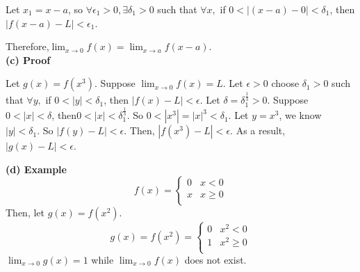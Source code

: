 \documentclass[a4paper,12pt]{report}
\begin{document}
\noindent
Let $x_1 = x-a$, so $\forall \epsilon_1>0, \exists \delta_1>0$ such that $\forall x,$ if $0<|(x-a)-0|<\delta_1$, then $|f(x-a)-L|<\epsilon_1$.

\noindent
Therefore,$\displaystyle{\lim_{x\to 0}}f(x)=\displaystyle{\lim_{x\to a}}f(x-a)$.\\

\noindent
\textbf{(c) Proof}

\noindent
Let $g(x)=f(x^3)$. Suppose $\displaystyle{\lim_{x\to 0}}f(x)=L$. Let $\epsilon >0$ choose $\delta_1>0$ such that $\forall y,$ if $0<|y|<\delta_1$, then $|f(x)-L|<\epsilon$. Let $\delta = \delta_1^\frac{1}{3}>0$. Suppose $0<|x|<\delta$, then$0<|x|<\delta_1^\frac{1}{3}$. So $0<|x^3|=|x|^3<\delta_1$. Let $y=x^3$, we know $|y|<\delta_1$. So $|f(y)-L|<\epsilon$. Then, $|f(x^3)-L|<\epsilon$. As a result, $|g(x)-L|<\epsilon$. 

\noindent
\textbf{(d) Example}
\[  f(x)= \left\{
\begin{array}{ll}
      0 & x<0 \\
      x & x\geq 0 \\
\end{array} 
\right. \]
\noindent
Then, let $g(x) = f(x^2)$.
\[  g(x)=f(x^2)= \left\{
\begin{array}{ll}
      0 & x^2<0 \\
      1 & x^2\geq 0 \\
\end{array} 
\right. \]
$\displaystyle{\lim_{x\to 0}}g(x)=1$ while $\displaystyle{\lim_{x\to 0}}f(x)$ does not exist.
\end{document}
